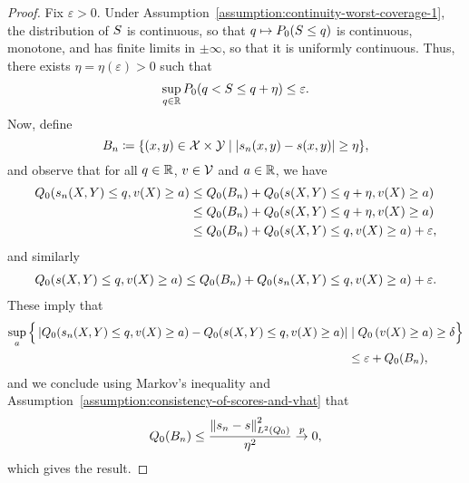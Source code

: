 \begin{proof}
  Fix $\varepsilon > 0$.  Under
  Assumption~\ref{assumption:continuity-worst-coverage-1}, the distribution
  of $S$ is continuous, so that $q \mapsto P_0( S \le q)$ is
  continuous, monotone, and has finite limits in $\pm \infty$, so that it is
  uniformly continuous. Thus, there exists $\eta = \eta(\varepsilon) >0$
  such that
  \begin{align*}
    \sup_{q \in \mathbb{R}} P_{0}(q < S\le q + \eta ) \le \varepsilon.
  \end{align*}
  Now, define
  \begin{equation*}
    B_{n} \coloneqq \{(x,y) \in \mathcal{X} \times \mathcal{Y} \mid |s_n(x,y)-s(x,y)| \ge \eta \},
  \end{equation*}
  and observe that for all $q \in \mathbb{R}$, $v \in \mathcal{V}$ and $a \in \mathbb{R}$, we have
  \begin{align*}
    Q_0( s_n(X,Y) \le q,  v(X) \ge a) &\le Q_0(B_{n}) + Q_0( s(X,Y) \le q+\eta,  v(X) \ge a) \\
    &\le Q_0(B_{n}) + Q_0( s(X,Y) \le q+\eta,  v(X) \ge a) \\
    &\le Q_0(B_{n}) +  Q_0( s(X,Y) \le q,  v(X) \ge a) + \varepsilon,
  \end{align*}
  and similarly
  \begin{align*}
    Q_0( s(X,Y) \le q,  v(X) \ge a) \le Q_0(B_{n}) +  Q_0( s_n(X,Y) \le q,  v(X) \ge a) + \varepsilon.
  \end{align*}
  These imply that
  \begin{align*}
    \sup_a \Big\{ \left| Q_0( s_n(X,Y) \le q, v(X) \ge a) - Q_0( s(X,Y) \le q, v(X) \ge a) \right|
    & \mid 
    Q_0\left( v(X) \ge a\right) \ge \delta
    \Big\} \\
    &\le \varepsilon + Q_0(B_{n}),
  \end{align*}
  and we conclude using Markov's inequality and
  Assumption~\ref{assumption:consistency-of-scores-and-vhat} that
  \begin{align*}
    Q_0(B_n) \le \frac{\left\|{s_n-s}\right\|_{L^2(Q_0)}^2}{\eta^2} \stackrel{p}{\rightarrow} 0,
  \end{align*}
  which gives the result.
\end{proof}

